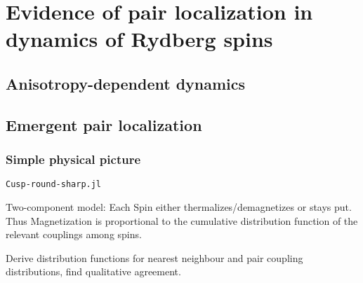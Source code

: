 \chapter{Evidence of pair localization in dynamics of Rydberg spins}
\section{Anisotropy-dependent dynamics}


\section{Emergent pair localization}


\subsection{Simple physical picture}
\texttt{Cusp-round-sharp.jl}

Two-component model: Each Spin either thermalizes/demagnetizes or stays put. Thus Magnetization is proportional to the cumulative distribution function of the relevant couplings among spins.

Derive distribution functions for nearest neighbour and pair coupling distributions, find qualitative agreement.